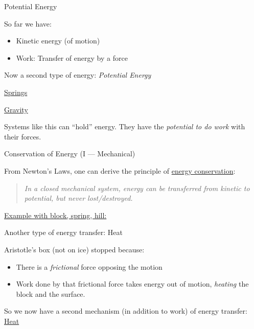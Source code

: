 \documentclass[12pt]{beamer}
\begin{document}
\begin{frame}{Potential Energy}

So far we have: 
	\begin{itemize}
	\item Kinetic energy (of motion)
	\item Work: Transfer of energy by a force
	\end{itemize}
Now a second type of energy: {\em Potential Energy}

\vspace{0.15cm}

\underline{Springs}

\vspace{2cm}

\underline{Gravity}

\vspace{2cm}

Systems like this can ``hold'' energy. They have the {\em potential to do work} with their forces.

\end{frame}
\begin{frame}{Conservation of Energy (I --- Mechanical)}

From Newton's Laws, one can derive the principle of \underline{energy conservation}:
	\begin{quote}
	\textit{In a closed mechanical system, energy can be transferred from kinetic to potential, but never lost/destroyed.}
	\end{quote}

\underline{Example with block, spring, hill:}
	
\vspace{6cm}

\end{frame}
\begin{frame}{Another type of energy transfer: Heat}

Aristotle's box (not on ice) stopped because:
	\begin{itemize}
	\item There is a {\em frictional} force opposing the motion
	\item Work done by that frictional force takes energy out of motion, {\em heating} the block and the surface.
	\end{itemize}
So we now have a second mechanism (in addition to work) of energy transfer: \underline{Heat}

\vspace{6cm}

\end{frame}
\end{document}
